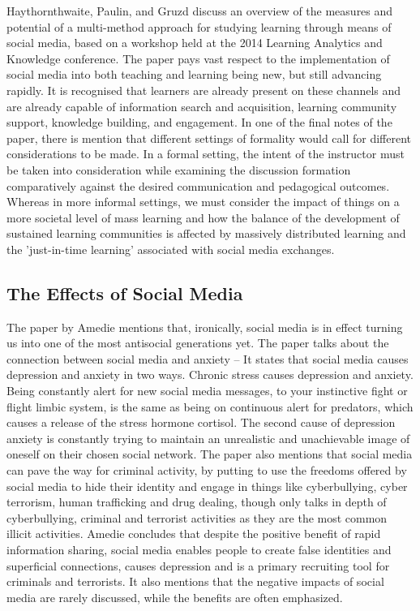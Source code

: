 \documentclass[lettersize,journal]{IEEEtran}
\begin{document}
    Haythornthwaite, Paulin, and Gruzd \cite{Haythornthwaite et al 2016}  discuss
    an overview of the measures and potential of a multi-method approach for studying learning
    through means of social media, based on a workshop held at the 2014 Learning
    Analytics and Knowledge conference. The paper pays vast respect to the
    implementation of social media into both teaching and learning being new,
    but still advancing rapidly. It is recognised that learners are already
    present on these channels and are already capable of information search and
    acquisition, learning community support, knowledge building, and engagement.
    In one of the final notes of the paper, there is mention that different
    settings of formality would call for different considerations to be made. In
    a formal setting, the intent of the instructor must be taken into
    consideration while examining the discussion formation comparatively against
    the desired communication and pedagogical outcomes. Whereas in more informal
    settings, we must consider the impact of things on a more societal level of
    mass learning and how the balance of the development of sustained learning
    communities is affected by massively distributed learning and the
    'just-in-time learning' associated with social media exchanges.

\subsection{The Effects of Social Media}
    The paper by Amedie \cite{Amedie 2015} mentions that, ironically, social
    media is in effect turning us into one of the most antisocial generations
    yet. The paper talks about the connection between social media and anxiety
    – It states that social media causes depression and anxiety in two ways. Chronic
    stress causes depression and anxiety. Being constantly alert for new social
    media messages, to your instinctive fight or flight limbic system, is the
    same as being on continuous alert for predators, which causes a release of
    the stress hormone cortisol. The second cause of depression anxiety is
    constantly trying to maintain an unrealistic and unachievable image of
    oneself on their chosen social network. The paper also mentions
    that social media can pave the way for criminal activity, by putting to use
    the freedoms offered by social media to hide their identity and engage in
    things like cyberbullying, cyber terrorism, human trafficking and drug dealing,
    though only talks in depth of cyberbullying, criminal and terrorist activities
    as they are the most common illicit activities. Amedie concludes that despite
    the positive benefit of rapid information sharing, social media enables people
    to create false identities and superficial connections, causes depression and
    is a primary recruiting tool for criminals and terrorists. It also mentions
    that the negative impacts of social media are rarely discussed, while the benefits
    are often emphasized.
\end{document}
